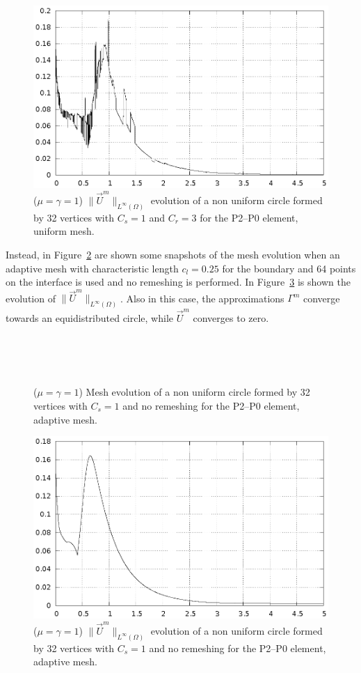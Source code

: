 \documentclass[a4paper,12pt,onecolumn]{article}
\begin{document}
\begin{figure}[htbp]
  \centering
  \includegraphics[width=.45\textwidth]{figures/nonuniform_bubble_velocity_remesh.ps}
  \caption{($\mu=\gamma=1$) $\|\vec U^m\|_{L^\infty(\Omega)}$ evolution of a non uniform circle formed by 32 vertices with $C_s=1$ and $C_r=3$ for the P2--P0 element, uniform mesh.}
  \label{fig:nonuniform_bubble_velocity_remesh}
\end{figure}

Instead, in Figure~\ref{fig:nonuniform_bubble_smooth} are shown some snapshots of the mesh evolution when an adaptive mesh with characteristic length $c_l=0.25$ for the boundary and 64 points on the interface is used and no remeshing is performed. In Figure~\ref{fig:nonuniform_bubble_velocity_smooth} is shown the evolution of $\|\vec U^m\|_{L^\infty(\Omega)}$. Also in this case, the approximations $\Gamma^m$ converge towards an equidistributed circle, while $\vec U^m$ converges to zero.
\begin{figure}[htbp]
  \centering
  \\
  \quad
  \\
  \quad
  \\
  \caption{($\mu=\gamma=1$) Mesh evolution of a non uniform circle formed by 32 vertices with $C_s=1$ and no remeshing for the P2--P0 element, adaptive mesh.}
  \label{fig:nonuniform_bubble_smooth}
\end{figure}

\begin{figure}[htbp]
  \centering
  \includegraphics[width=.45\textwidth]{figures/nonuniform_bubble_velocity_smooth.ps}
  \caption{($\mu=\gamma=1$) $\|\vec U^m\|_{L^\infty(\Omega)}$ evolution of a non uniform circle formed by 32 vertices with $C_s=1$ and no remeshing for the P2--P0 element, adaptive mesh.}
  \label{fig:nonuniform_bubble_velocity_smooth}
\end{figure}
\end{document}
